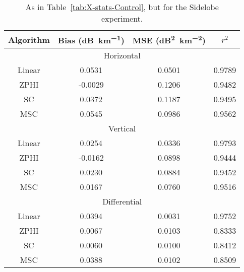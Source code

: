 \begin{table}
    \centering
    \begin{tabular}{| c | c | c | c |}
        \hline
        Algorithm & Bias (\si{dB\per \kilo\meter}) & MSE (\si{dB\squared \per \kilo\meter \squared}) & $r^2$ \\
        \hline
        \hline
        \multicolumn{4}{|c|}{Horizontal}\\
        \hline
        Linear & 0.0531 & 0.0501 & 0.9789\\
        ZPHI & -0.0029 & 0.1206 & 0.9482\\
        SC & 0.0372 & 0.1187 & 0.9495\\
        MSC & 0.0545 & 0.0986 & 0.9562\\
        \hline
        \multicolumn{4}{|c|}{Vertical}\\
        \hline
        Linear & 0.0254 & 0.0336 & 0.9793\\
        ZPHI & -0.0162 & 0.0898 & 0.9444\\
        SC & 0.0230 & 0.0884 & 0.9452\\
        MSC & 0.0167 & 0.0760 & 0.9516\\
        \hline
        \multicolumn{4}{|c|}{Differential}\\
        \hline
        Linear & 0.0394 & 0.0031 & 0.9752\\
        ZPHI & 0.0067 & 0.0103 & 0.8333\\
        SC & 0.0060 & 0.0100 & 0.8412\\
        MSC & 0.0388 & 0.0102 & 0.8509\\
\hline
    \end{tabular}
    \caption{As in Table~\ref{tab:X-stats-Control}, but for
    the Sidelobe experiment.}
    \label{tab:X-stats-Sidelobe}
\end{table}
